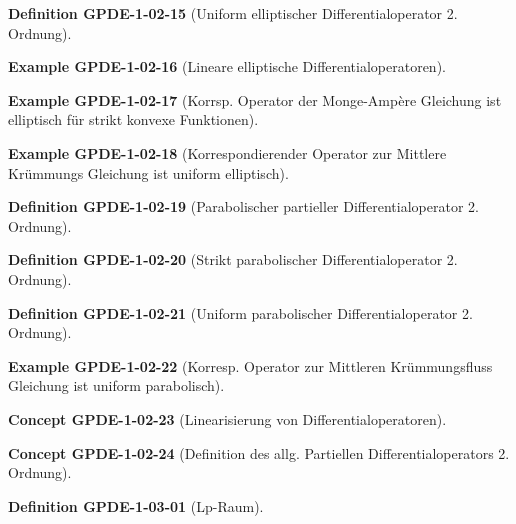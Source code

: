 \documentclass[10pt, letterpaper]{article}
\newcommand{\CustomHeading}[3]{%
  \par\medskip\noindent%
  \textbf{#1 #2} \textnormal{(#3)}.\enskip%
}
\newenvironment{DEF}[2]{\CustomHeading{Definition}{#1}{#2}}{}
\newenvironment{EXA}[2]{\CustomHeading{Example}{#1}{#2}}{}
\newenvironment{CONC}[2]{\CustomHeading{Concept}{#1}{#2}}{}
\begin{document}
\begin{DEF}{GPDE-1-02-15}{Uniform elliptischer Differentialoperator 2. Ordnung}
\end{DEF}

\begin{EXA}{GPDE-1-02-16}{Lineare elliptische Differentialoperatoren}
\end{EXA}

\begin{EXA}{GPDE-1-02-17}{Korrsp. Operator der Monge-Ampère Gleichung ist elliptisch für strikt konvexe Funktionen}
\end{EXA}

\begin{EXA}{GPDE-1-02-18}{Korrespondierender Operator zur Mittlere Krümmungs Gleichung ist uniform elliptisch}
\end{EXA}

\begin{DEF}{GPDE-1-02-19}{Parabolischer partieller Differentialoperator 2. Ordnung}
\end{DEF}

\begin{DEF}{GPDE-1-02-20}{Strikt parabolischer Differentialoperator 2. Ordnung}
\end{DEF}

\begin{DEF}{GPDE-1-02-21}{Uniform parabolischer Differentialoperator 2. Ordnung}
\end{DEF}

\begin{EXA}{GPDE-1-02-22}{Korresp. Operator zur Mittleren Krümmungsfluss Gleichung ist uniform parabolisch}
\end{EXA}

\begin{CONC}{GPDE-1-02-23}{Linearisierung von Differentialoperatoren}
\end{CONC}

\begin{CONC}{GPDE-1-02-24}{Definition des allg. Partiellen Differentialoperators 2. Ordnung}
\end{CONC}

\begin{DEF}{GPDE-1-03-01}{Lp-Raum}
\end{DEF}
\end{document}
